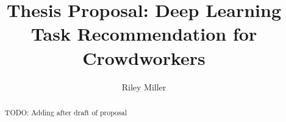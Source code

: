 \documentclass[letterpaper,12pt]{article}
\title{Thesis Proposal: Deep Learning Task Recommendation for Crowdworkers}
\author{Riley Miller}
\begin{document}


\frontmatter


\maketitle
\newpage


\makecopyright{\the\year}
\newpage


\makesubmittal
\newpage


\begin{abstract}

TODO: Adding after draft of proposal
\end{abstract}

\newpage


\tableofcontents
\newpage






\end{document}
